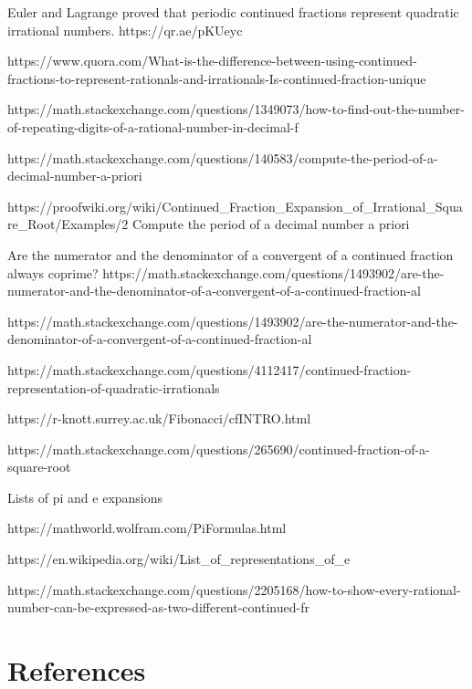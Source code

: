 \documentclass[
  a4paper,
]{article}
\begin{document}
Euler and Lagrange proved that periodic continued fractions represent
quadratic irrational numbers. https://qr.ae/pKUeyc

https://www.quora.com/What-is-the-difference-between-using-continued-fractions-to-represent-rationals-and-irrationals-Is-continued-fraction-unique

https://math.stackexchange.com/questions/1349073/how-to-find-out-the-number-of-repeating-digits-of-a-rational-number-in-decimal-f

https://math.stackexchange.com/questions/140583/compute-the-period-of-a-decimal-number-a-priori

https://proofwiki.org/wiki/Continued\_Fraction\_Expansion\_of\_Irrational\_Square\_Root/Examples/2
Compute the period of a decimal number a priori

Are the numerator and the denominator of a convergent of a continued
fraction always coprime?
https://math.stackexchange.com/questions/1493902/are-the-numerator-and-the-denominator-of-a-convergent-of-a-continued-fraction-al

https://math.stackexchange.com/questions/1493902/are-the-numerator-and-the-denominator-of-a-convergent-of-a-continued-fraction-al

https://math.stackexchange.com/questions/4112417/continued-fraction-representation-of-quadratic-irrationals

https://r-knott.surrey.ac.uk/Fibonacci/cfINTRO.html

https://math.stackexchange.com/questions/265690/continued-fraction-of-a-square-root

Lists of pi and e expansions

https://mathworld.wolfram.com/PiFormulas.html

https://en.wikipedia.org/wiki/List\_of\_representations\_of\_e

https://math.stackexchange.com/questions/2205168/how-to-show-every-rational-number-can-be-expressed-as-two-different-continued-fr

\section*{References}\label{bibliography}
\end{document}
